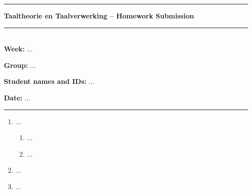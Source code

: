\documentclass[11pt]{article}
\begin{document}

\rule{\textwidth}{1pt}
\begin{center}
  \textbf{Taaltheorie en Taalverwerking -- Homework Submission}
\end{center}
\rule{\textwidth}{0.5pt}\\


\textbf{Week:} ...

\textbf{Group:} ...

\textbf{Student names and IDs:} ...

\textbf{Date:} ...

\rule{\textwidth}{1pt}


\begin{enumerate}

\item ...

  \begin{enumerate}
    \item ...
    \item ...
  \end{enumerate}

\item ...

\item ...

\end{enumerate}


\end{document}
